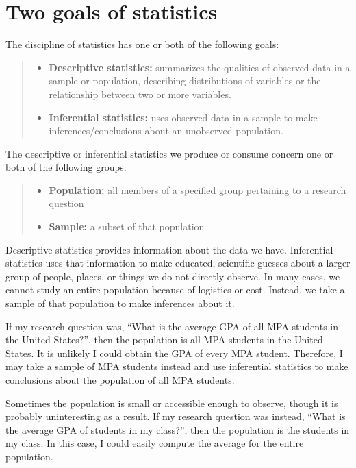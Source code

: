 \documentclass[
]{book}
\providecommand{\tightlist}{%
  \setlength{\itemsep}{0pt}\setlength{\parskip}{0pt}}
\begin{document}
\hypertarget{two-goals-of-statistics}{%
\section{Two goals of statistics}\label{two-goals-of-statistics}}

The discipline of statistics has one or both of the following goals:

\begin{quote}
\begin{itemize}
\tightlist
\item
  \textbf{Descriptive statistics:} summarizes the qualities of observed data in a sample or population, describing distributions of variables or the relationship between two or more variables.
\item
  \textbf{Inferential statistics:} uses observed data in a sample to make inferences/conclusions about an unobserved population.
\end{itemize}
\end{quote}

The descriptive or inferential statistics we produce or consume concern one or both of the following groups:

\begin{quote}
\begin{itemize}
\tightlist
\item
  \textbf{Population:} all members of a specified group pertaining to a research question
\item
  \textbf{Sample:} a subset of that population
\end{itemize}
\end{quote}

Descriptive statistics provides information about the data we have. Inferential statistics uses that information to make educated, scientific guesses about a larger group of people, places, or things we do not directly observe. In many cases, we cannot study an entire population because of logistics or cost. Instead, we take a sample of that population to make inferences about it.

If my research question was, ``What is the average GPA of all MPA students in the United States?'', then the population is all MPA students in the United States. It is unlikely I could obtain the GPA of every MPA student. Therefore, I may take a sample of MPA students instead and use inferential statistics to make conclusions about the population of all MPA students.

Sometimes the population is small or accessible enough to observe, though it is probably uninteresting as a result. If my research question was instead, ``What is the average GPA of students in my class?'', then the population is the students in my class. In this case, I could easily compute the average for the entire population.
\end{document}
